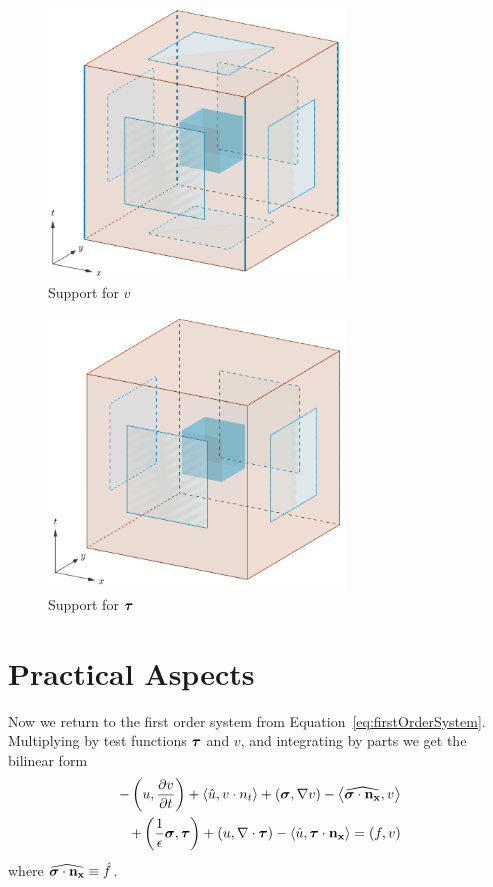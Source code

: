 \documentclass{article}
\begin{document}
\begin{figure}[p]
  \centering
  \includegraphics[width=0.7\textwidth]{v3D.png}
  \caption{Support for $v$}
  \label{fig:v3D}
\end{figure}

\begin{figure}[p]
  \centering
  \includegraphics[width=0.7\textwidth]{tau3D.png}
  \caption{Support for $\boldsymbol\tau$}
  \label{fig:tau3D}
\end{figure}

\section*{Practical Aspects}
Now we return to the first order system from Equation~\ref{eq:firstOrderSystem}.
Multiplying by test functions $\boldsymbol\tau$ and $v$, and integrating by parts we
get the bilinear form
\begin{align*}
-\left( u,\frac{\partial v}{\partial t} \right)
+\left\langle \hat u,v\cdot n_t \right\rangle
+\left( \boldsymbol\sigma,\nabla v \right)
-\left\langle \widehat{\boldsymbol\sigma\cdot\mathbf{n_x}}, v \right\rangle\\
+\left( \frac{1}{\epsilon}\boldsymbol\sigma,\boldsymbol\tau \right)
+\left( u,\nabla\cdot\boldsymbol\tau \right)
-\left\langle \hat u,\boldsymbol\tau\cdot\mathbf{n_x} \right\rangle
=\left( f,v \right)
\end{align*}
where $\widehat{\boldsymbol\sigma\cdot\mathbf{n_x}}\equiv\hat f$.
\end{document}
